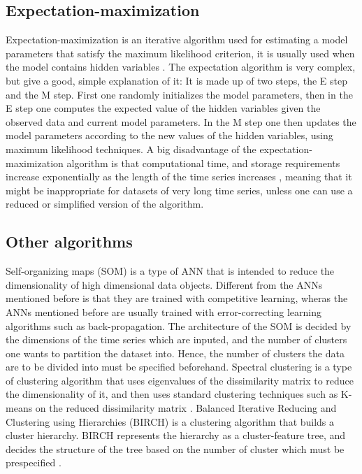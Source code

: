 \subsection{Expectation-maximization}
Expectation-maximization is an iterative algorithm used for estimating a model parameters that satisfy the maximum likelihood criterion,
it is usually used when the model contains hidden variables \cite{em_wikipedia}. 
The expectation algorithm is very complex, but \textcite{mixture_gaussian_hmm} give a good, simple explanation of it:
It is made up of two steps, the E step and the M step. 
First one randomly initializes the model parameters, then in the E step one computes the expected value of the hidden variables given the observed data and current model parameters.
In the M step one then updates the model parameters according to the new values of the hidden variables, using maximum likelihood techniques.
A big disadvantage of the expectation-maximization algorithm is that computational time, and storage requirements increase exponentially as the length of the time series increases \cite{mixture_gaussian_hmm},
meaning that it might be inappropriate for datasets of very long time series, unless one can use a reduced or simplified version of the algorithm. 

\subsection{Other algorithms}
Self-organizing maps (SOM) is a type of ANN that is intended to reduce the dimensionality of high dimensional data objects.
Different from the ANNs mentioned before is that they are trained with competitive learning, wheras the ANNs mentioned before are usually trained with error-correcting learning algorithms such as back-propagation. \cite{som_wikipedia}
The architecture of the SOM is decided by the dimensions of the time series which are inputed, and the number of clusters one wants to partition the dataset into.
Hence, the number of clusters the data are to be divided into must be specified beforehand. 
Spectral clustering is a type of clustering algorithm that uses eigenvalues of the dissimilarity matrix to reduce the dimensionality of it, 
and then uses standard clustering techniques such as K-means on the reduced dissimilarity matrix \cite{spectral_cl_wikipedia}.
Balanced Iterative Reducing and Clustering using Hierarchies (BIRCH) is a clustering algorithm that builds a cluster hierarchy. 
BIRCH represents the hierarchy as a cluster-feature tree, and decides the structure of the tree based on the number of cluster which must be prespecified \cite{birch_wikipedia}.

